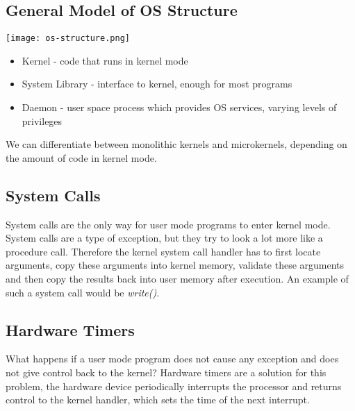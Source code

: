 \subsection{General Model of OS Structure}

\begin{center}
	\texttt{[image: os-structure.png]}
\end{center}

\begin{itemize}
	\item Kernel - code that runs in kernel mode
	\item System Library - interface to kernel, enough for most programs
	\item Daemon - user space process which provides OS services, varying levels of privileges
\end{itemize}

We can differentiate between monolithic kernels and microkernels, depending on the amount of code in kernel mode.


\subsection{System Calls}

System calls are the only way for user mode programs to enter kernel mode. System calls are a type of exception, but they try to look a lot more like a procedure call. Therefore the kernel system call handler has to first locate arguments, copy these arguments into kernel memory, validate these arguments and then copy the results back into user memory after execution. An example of such a system call would be \textit{write()}. 


\subsection{Hardware Timers}

What happens if a user mode program does not cause any exception and does not give control back to the kernel? Hardware timers are a solution for this problem, the hardware device periodically interrupts the processor and returns control to the kernel handler, which sets the time of the next interrupt.
